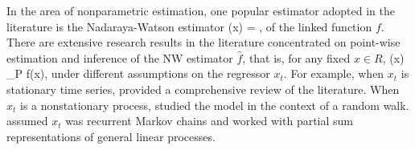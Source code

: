 In the area of nonparametric estimation, one popular estimator adopted in the literature is the Nadaraya-Watson estimator
\bestar
  (x) = ,
\eestar
of the linked function $f$. There are extensive research results in the literature concentrated on point-wise estimation and inference of the NW estimator $\widehat{f}$, that is, for any fixed $x \in R$,
\bestar
{}(x) \to_P f(x),
\eestar
under different assumptions on the regressor $x_t$. For example, when $x_t$ is stationary time series, \cite{hardlelutkepohlchen1997} provided a comprehensive review of the literature. When $x_t$ is a nonstationary process, \cite{phillipspark1998} studied the model in the context of a random walk. \cite{karlsentjostheim2001} assumed $x_t$ was recurrent Markov chains and \citet[][\citeyear{wangphillips2009}, \citeyear{wangphillips2010b}]{wangphillips2010a} worked with partial sum representations of general linear processes. 

